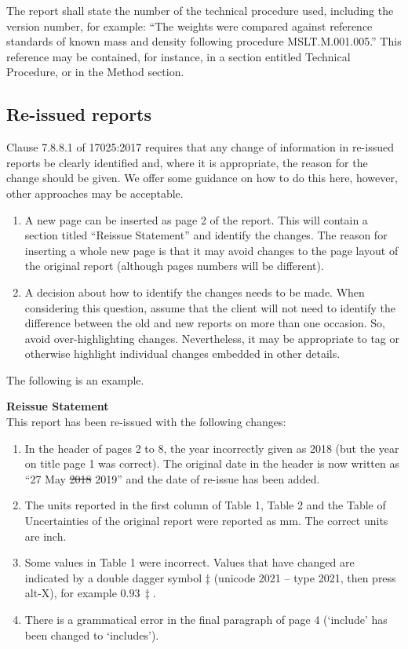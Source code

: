 The report shall state the number of the technical procedure used, including the version number, for example: ``The weights were compared against reference standards of known mass and density following procedure MSLT.M.001.005.''  This reference may be contained, for instance, in a section entitled Technical Procedure, or in the Method section.

\subsection{Re-issued reports}
 \label{ss:reissued_reports}
Clause 7.8.8.1 of 17025:2017 requires that any change of information in re-issued reports be clearly identified and, where it is appropriate, the reason for the change should be given. We offer some guidance on how to do this here, however, other approaches may be acceptable.
\begin{enumerate}
\item	A new page can be inserted as page 2 of the report. This will contain a section titled ``Reissue Statement'' and identify the changes. The reason for inserting a whole new page is that it may avoid changes to the page layout of the original report (although pages numbers will be different).
\item	A decision about how to identify the changes needs to be made. When considering this question, assume that the client will not need to identify the difference between the old and new reports on more than one occasion. So, avoid over-highlighting changes. Nevertheless, it may be appropriate to tag or otherwise highlight individual changes embedded in other details. 
\end{enumerate}
The following is an example.

\textbf{\large Reissue Statement}\\

This report has been re-issued with the following changes:
\begin{enumerate}
\item	In the header of pages 2 to 8, the year incorrectly given as 2018 (but the year on title page 1 was correct).  The original date in the header is now written as ``27 May \sout{2018} 2019'' and the date of re-issue has been added.  
\item	The units reported in the first column of Table 1, Table 2 and the Table of Uncertainties of the original report were reported as mm. The correct units are inch. 
\item	Some values in Table 1 were incorrect. Values that have changed are indicated by a double dagger symbol $\ddagger$ (unicode 2021 – type 2021, then press alt-X), for example $0.93\,\ddagger$.
\item	There is a grammatical error in the final paragraph of page 4 (`include' has been changed to `includes').
\end{enumerate}  

